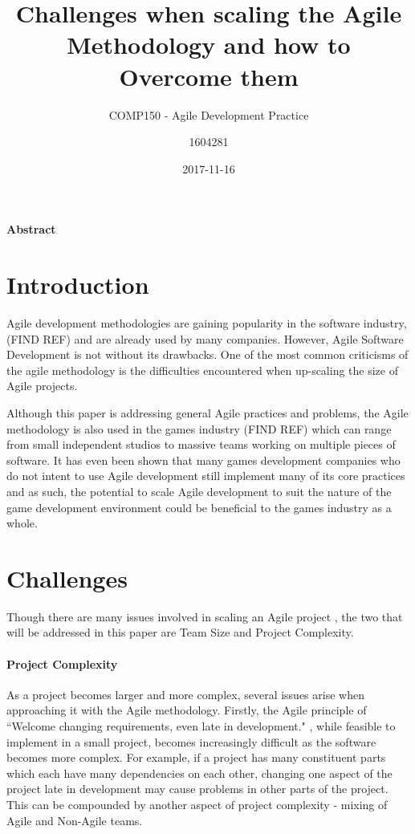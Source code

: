 \documentclass{scrartcl}
\title{Challenges when scaling the Agile Methodology and how to Overcome them}
\subtitle{COMP150 - Agile Development Practice}
\date{2017-11-16}
\author{1604281}
\begin{document}
\maketitle
{}

\paragraph{Abstract}


\section{Introduction}

Agile development methodologies are gaining popularity in the software industry, (FIND REF) and are already used by many companies. However, Agile Software Development is not without its drawbacks. One of the most common criticisms of the agile methodology \cite{begel2007usage} is the difficulties encountered when up-scaling the size of Agile projects.

Although this paper is addressing general Agile practices and problems, the Agile methodology is also used in the games industry (FIND REF) which can range from small independent studios to massive teams working on multiple pieces of software. It has even been shown that many games development companies who do not intent to use Agile development still implement many of its core practices \cite{petrillo2010agility} and as such, the potential to scale Agile development to suit the nature of the game development environment could be beneficial to the games industry as a whole. 

\section{Challenges}

Though there are many issues involved in scaling an Agile project \cite{turk2014limitations}, the two that will be addressed in this paper are Team Size and Project Complexity. 

\paragraph{Project Complexity}\mbox{}\newline

As a project becomes larger and more complex, several issues arise when approaching it with the Agile methodology. Firstly, the Agile principle of ``Welcome changing requirements, even late in development." \cite{AgileManifesto}, while feasible to implement in a small project, becomes increasingly difficult as the software becomes more complex. For example, if a project has many constituent parts which each have many dependencies on each other, changing one aspect of the project late in development may cause problems in other parts of the project. This can be compounded by another aspect of project complexity - mixing of Agile and Non-Agile teams.
\end{document}
